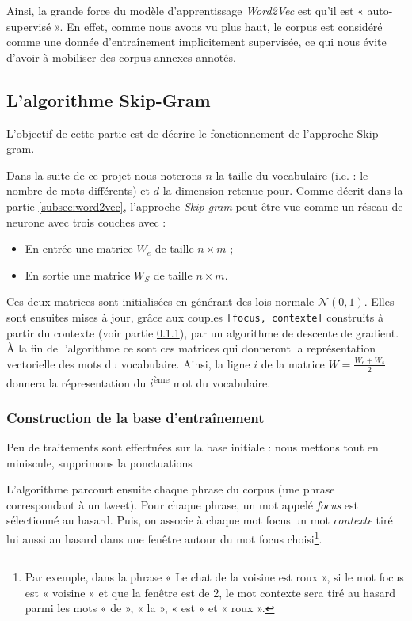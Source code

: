 \documentclass[11pt,french,french]{article}
\let\rmarkdownfootnote\footnote%
\def\footnote{\protect\rmarkdownfootnote}
\begin{document}
Ainsi, la grande force du modèle d'apprentissage \emph{Word2Vec} est
qu'il est « auto-supervisé ». En effet, comme nous avons vu plus haut,
le corpus est considéré comme une donnée d'entraînement implicitement
supervisée, ce qui nous évite d'avoir à mobiliser des corpus annexes
annotés.

\subsection{L'algorithme Skip-Gram}\label{sec:skipgram}

L'objectif de cette partie est de décrire le fonctionnement de
l'approche Skip-gram.

Dans la suite de ce projet nous noterons \(n\) la taille du vocabulaire
(i.e. : le nombre de mots différents) et \(d\) la dimension retenue
pour. Comme décrit dans la partie \ref{subsec:word2vec}, l'approche
\emph{Skip-gram} peut être vue comme un réseau de neurone avec trois
couches avec :

\begin{itemize}
\item
  En entrée une matrice \(W_e\) de taille \(n\times m\) ;
\item
  En sortie une matrice \(W_S\) de taille \(n\times m\).
\end{itemize}

Ces deux matrices sont initialisées en générant des lois normale
\(\mathcal N(0,1)\). Elles sont ensuites mises à jour, grâce aux couples
\texttt{{[}focus,\ contexte{]}} construits à partir du contexte (voir
partie \ref{subsec:baseentrainement}), par un algorithme de descente de
gradient. À la fin de l'algorithme ce sont ces matrices qui donneront la
représentation vectorielle des mots du vocabulaire. Ainsi, la ligne
\(i\) de la matrice \(W=\frac{W_e+W_s}{2}\) donnera la répresentation du
\(i\)\textsuperscript{ème} mot du vocabulaire.

\subsubsection{Construction de la base
d'entraînement}\label{subsec:baseentrainement}

Peu de traitements sont effectuées sur la base initiale : nous mettons
tout en miniscule, supprimons la ponctuations

L'algorithme parcourt ensuite chaque phrase du corpus (une phrase
correspondant à un tweet). Pour chaque phrase, un mot appelé
\emph{focus} est sélectionné au hasard. Puis, on associe à chaque mot
focus un mot \emph{contexte} tiré lui aussi au hasard dans une fenêtre
autour du mot focus choisi\footnote{Par exemple, dans la phrase « Le
  chat de la voisine est roux », si le mot focus est « voisine » et que
  la fenêtre est de 2, le mot contexte sera tiré au hasard parmi les
  mots « de », « la », « est » et « roux ».}.
\end{document}
